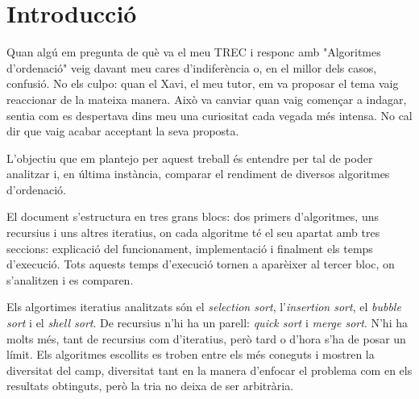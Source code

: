 \chapter{Introducció}
Quan algú em pregunta de què va el meu TREC i responc amb "Algoritmes d'ordenació" veig davant meu cares d'indiferència o, en el millor dels casos, confusió.
No els culpo: quan el Xavi, el meu tutor, em va proposar el tema vaig reaccionar de la mateixa manera.
Això va canviar quan vaig començar a indagar, sentia com es despertava dins meu una curiositat cada vegada més intensa. 
No cal dir que vaig acabar acceptant la seva proposta.

L'objectiu que em plantejo per aquest treball és entendre per tal de poder analitzar i, en última instància, comparar el rendiment de diversos algoritmes d'ordenació.

El document s'estructura en tres grans blocs: dos primers d'algoritmes, uns recursius i uns altres iteratius, on cada algoritme té el seu apartat amb tres seccions: explicació del funcionament, implementació i finalment els temps d'execució. Tots aquests temps d'execució tornen a aparèixer al tercer bloc, on s'analitzen i es comparen.

Els algortimes iteratius analitzats són el \textit{selection sort}, l'\textit{insertion sort}, el \textit{bubble sort} i el \textit{shell sort}. De recursius n'hi ha un parell: \textit{quick sort} i \textit{merge sort}. N'hi ha molts més, tant de recursius com d'iteratius, però tard o d'hora s'ha de posar un límit. Els algoritmes escollits es troben entre els més coneguts i mostren la diversitat del camp, diversitat tant en la manera d'enfocar el problema com en els resultats obtinguts, però la tria no deixa de ser arbitrària.